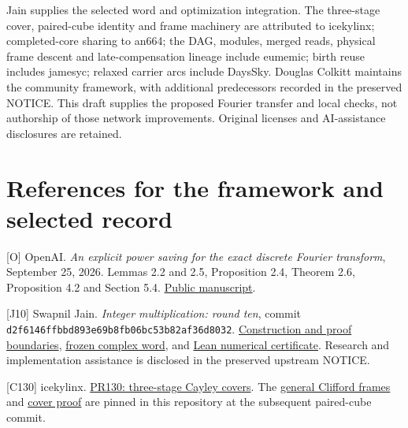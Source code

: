 \documentclass[
  11pt,
]{article}
\begin{document}
Jain supplies the selected word and optimization integration. The
three-stage cover, paired-cube identity and frame machinery are
attributed to icekylinx; completed-core sharing to an664; the DAG,
modules, merged reads, physical frame descent and late-compensation
lineage include eumemic; birth reuse includes jamesyc; relaxed carrier
arcs include DaysSky. Douglas Colkitt maintains the community framework,
with additional predecessors recorded in the preserved NOTICE. This
draft supplies the proposed Fourier transfer and local checks, not
authorship of those network improvements. Original licenses and
AI-assistance disclosures are retained.

\section{References for the framework and selected
record}\label{references-for-the-framework-and-selected-record}

{[}O{]} OpenAI. \emph{An explicit power saving for the exact discrete
Fourier transform}, September 25, 2026. Lemmas 2.2 and 2.5, Proposition
2.4, Theorem 2.6, Proposition 4.2 and Section 5.4.
\href{https://github.com/openai/math/blob/main/preprints/An-explicit-power-saving-for-the-exact-discrete-Fourier-transform-September-25-2026/main.pdf}{Public
manuscript}.

{[}J10{]} Swapnil Jain. \emph{Integer multiplication: round ten}, commit
\texttt{d2f6146ffb\allowbreak{}bd893e69b8\allowbreak{}fb06bc53b8\allowbreak{}2af36d8032}.
\href{https://github.com/Swapnil-jain/integer-mult-kappa/blob/d2f6146ffbbd893e69b8fb06bc53b82af36d8032/README.md}{Construction
and proof boundaries},
\href{https://github.com/Swapnil-jain/integer-mult-kappa/blob/d2f6146ffbbd893e69b8fb06bc53b82af36d8032/certificates/round10/cx_prefix_word_p11.json.gz}{frozen
complex word}, and
\href{https://github.com/Swapnil-jain/integer-mult-kappa/blob/d2f6146ffbbd893e69b8fb06bc53b82af36d8032/lean/Round10.lean}{Lean
numerical certificate}. Research and implementation assistance is
disclosed in the preserved upstream NOTICE.

{[}C130{]} icekylinx.
\href{https://github.com/CrocSwap/integer-mult-bounds/pull/130}{PR130:
three-stage Cayley covers}. The
\href{https://github.com/icekylinx/integer-mult-bounds/blob/c8b22bc5c10dba497ac25804e27d9647d818e2ff/notes/general-clifford-frames.tex}{general
Clifford frames} and
\href{https://github.com/icekylinx/integer-mult-bounds/blob/c8b22bc5c10dba497ac25804e27d9647d818e2ff/notes/three-stage-cover-complex.tex}{cover
proof} are pinned in this repository at the subsequent paired-cube
commit.
\end{document}
